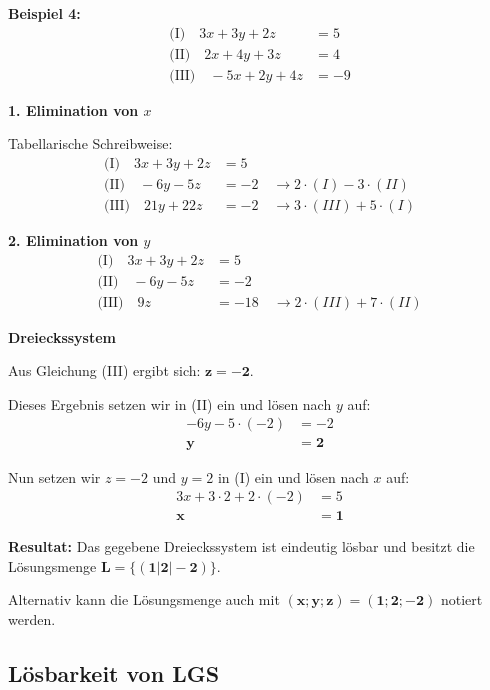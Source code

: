 \documentclass{article}
\begin{document}
\newpage

\textbf{Beispiel 4:}
\begin{align}
\text{(I)} \quad 3x + 3y + 2z &= 5\\
\text{(II)} \quad 2x + 4y + 3z &= 4\\
\text{(III)} \quad -5x + 2y + 4z &= -9
\end{align}

\textbf{1. Elimination von $x$}

Tabellarische Schreibweise:
\begin{align}
\text{(I)} \quad 3x + 3y + 2z &= 5\\
\text{(II)} \quad -6y - 5z &= -2 \quad \rightarrow 2 \cdot (I) - 3 \cdot (II)\\
\text{(III)} \quad 21y + 22z &= -2 \quad \rightarrow 3 \cdot (III) + 5 \cdot (I)
\end{align}

\textbf{2. Elimination von $y$}
\begin{align}
\text{(I)} \quad 3x + 3y + 2z &= 5\\
\text{(II)} \quad -6y - 5z &= -2\\
\text{(III)} \quad 9z &= -18 \quad \rightarrow 2 \cdot (III) + 7 \cdot (II)
\end{align}

\textbf{Dreieckssystem}

Aus Gleichung (III) ergibt sich: $\mathbf{z = -2}$.

Dieses Ergebnis setzen wir in (II) ein und lösen nach $y$ auf:
\begin{align}
-6y - 5 \cdot (-2) &= -2\\
\mathbf{y} &= \mathbf{2}
\end{align}

Nun setzen wir $z = -2$ und $y = 2$ in (I) ein und lösen nach $x$ auf:
\begin{align}
3x + 3 \cdot 2 + 2 \cdot (-2) &= 5\\
\mathbf{x} &= \mathbf{1}
\end{align}

\textbf{Resultat:} Das gegebene Dreieckssystem ist eindeutig lösbar und besitzt die Lösungsmenge $\mathbf{L = \{(1|2|-2)\}}$.

Alternativ kann die Lösungsmenge auch mit $\mathbf{(x; y; z) = (1; 2; -2)}$ notiert werden.

\newpage

\subsection{Lösbarkeit von LGS}
\end{document}
